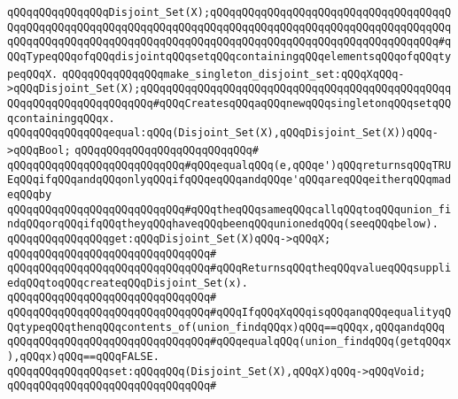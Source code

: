 \verb|qQQqqQQqqQQqqQQqDisjoint_Set(X);qQQqqQQqqQQqqQQqqQQqqQQqqQQqqQQqqQQqqQQqqQQqqQQqqQQqqQQqqQQqqQQqqQQqqQQqqQQqqQQqqQQqqQQqqQQqqQQqqQQqqQQqqQQqqQQqqQQqqQQqqQQqqQQqqQQqqQQqqQQqqQQqqQQqqQQqqQQqqQQqqQQqqQQqqQQqqQQq#qQQqTypeqQQqofqQQqdisjointqQQqsetqQQqcontainingqQQqelementsqQQqofqQQqtypeqQQqX.|\newline
\newline
\verb|qQQqqQQqqQQqqQQqmake_singleton_disjoint_set:qQQqXqQQq->qQQqDisjoint_Set(X);qQQqqQQqqQQqqQQqqQQqqQQqqQQqqQQqqQQqqQQqqQQqqQQqqQQqqQQqqQQqqQQqqQQqqQQq#qQQqCreatesqQQqaqQQqnewqQQqsingletonqQQqsetqQQqcontainingqQQqx.|\newline
\newline
\newline
\verb|qQQqqQQqqQQqqQQqequal:qQQq(Disjoint_Set(X),qQQqDisjoint_Set(X))qQQq->qQQqBool;|\newline
\verb|qQQqqQQqqQQqqQQqqQQqqQQqqQQq#|\newline
\verb|qQQqqQQqqQQqqQQqqQQqqQQqqQQq#qQQqequalqQQq(e,qQQqe')qQQqreturnsqQQqTRUEqQQqifqQQqandqQQqonlyqQQqifqQQqeqQQqandqQQqe'qQQqareqQQqeitherqQQqmadeqQQqby|\newline
\verb|qQQqqQQqqQQqqQQqqQQqqQQqqQQq#qQQqtheqQQqsameqQQqcallqQQqtoqQQqunion_findqQQqorqQQqifqQQqtheyqQQqhaveqQQqbeenqQQqunionedqQQq(seeqQQqbelow).|\newline
\newline
\newline
\verb|qQQqqQQqqQQqqQQqget:qQQqDisjoint_Set(X)qQQq->qQQqX;|\newline
\verb|qQQqqQQqqQQqqQQqqQQqqQQqqQQqqQQq#|\newline
\verb|qQQqqQQqqQQqqQQqqQQqqQQqqQQqqQQq#qQQqReturnsqQQqtheqQQqvalueqQQqsuppliedqQQqtoqQQqcreateqQQqDisjoint_Set(x).|\newline
\verb|qQQqqQQqqQQqqQQqqQQqqQQqqQQqqQQq#|\newline
\verb|qQQqqQQqqQQqqQQqqQQqqQQqqQQqqQQq#qQQqIfqQQqXqQQqisqQQqanqQQqequalityqQQqtypeqQQqthenqQQqcontents_of(union_findqQQqx)qQQq==qQQqx,qQQqandqQQq|\newline
\verb|qQQqqQQqqQQqqQQqqQQqqQQqqQQqqQQq#qQQqequalqQQq(union_findqQQq(getqQQqx),qQQqx)qQQq==qQQqFALSE.|\newline
\newline
\newline
\newline
\verb|qQQqqQQqqQQqqQQqset:qQQqqQQq(Disjoint_Set(X),qQQqX)qQQq->qQQqVoid;|\newline
\verb|qQQqqQQqqQQqqQQqqQQqqQQqqQQqqQQq#|\newline
